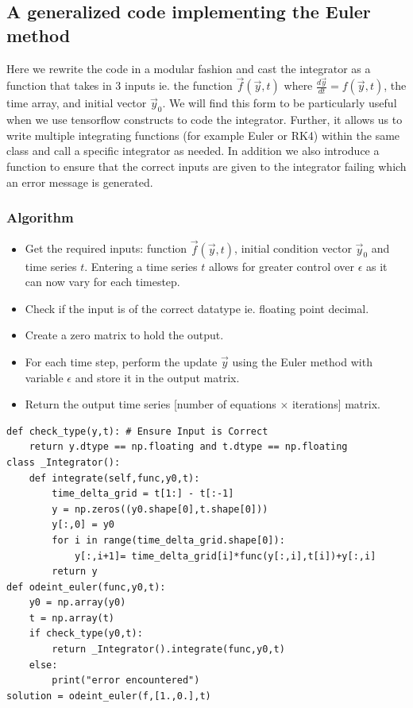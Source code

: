 \documentclass[10pt,letterpaper]{article}
\begin{document}
\subsection*{A generalized code implementing the Euler method}
Here we rewrite the code in a modular fashion and cast the integrator as a function that takes in 3 inputs ie. the function $\vec{f}(\vec{y},t)$ where $\frac{d\vec{y}}{dt}=f(\vec{y},t)$, the time array, and initial vector $\vec{y}_{0}$. We will find this form to be particularly useful when we use tensorflow constructs to code the integrator. Further, it allows us to write multiple integrating functions (for example Euler or RK4) within the same class and call a specific integrator as needed. In addition we also introduce a function to ensure that the correct inputs are given to the integrator failing which an error message is generated. 

\subsubsection*{Algorithm}

\begin{itemize}
\item Get the required inputs: function $\vec{f}(\vec{y},t)$, initial condition vector $\vec{y}_0$ and time series $t$. Entering a time series $t$ allows for greater control over $\epsilon$ as it can now vary for each timestep. 
\item Check if the input is of the correct datatype ie. floating point decimal.
\item Create a zero matrix to hold the output.
\item For each time step, perform the update $\vec{y}$ using the Euler method with variable $\epsilon$ and store it in the output matrix.
\item Return the output time series [number of equations $\times$ iterations] matrix.
\end{itemize}

\begin{verbatim}
def check_type(y,t): # Ensure Input is Correct
    return y.dtype == np.floating and t.dtype == np.floating
class _Integrator():
    def integrate(self,func,y0,t):
        time_delta_grid = t[1:] - t[:-1]
        y = np.zeros((y0.shape[0],t.shape[0]))
        y[:,0] = y0
        for i in range(time_delta_grid.shape[0]):
            y[:,i+1]= time_delta_grid[i]*func(y[:,i],t[i])+y[:,i]
        return y
def odeint_euler(func,y0,t):
    y0 = np.array(y0)
    t = np.array(t)
    if check_type(y0,t):
        return _Integrator().integrate(func,y0,t)
    else:
        print("error encountered")
solution = odeint_euler(f,[1.,0.],t)
\end{verbatim}
\end{document}
